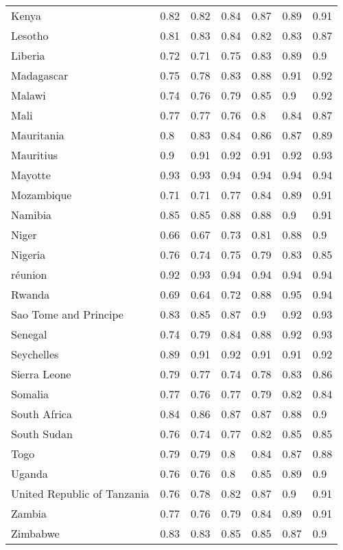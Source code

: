 \begin{longtable}[t]{lllllll}
Kenya & 0.82 & 0.82 & 0.84 & 0.87 & 0.89 & 0.91\\
Lesotho & 0.81 & 0.83 & 0.84 & 0.82 & 0.83 & 0.87\\
Liberia & 0.72 & 0.71 & 0.75 & 0.83 & 0.89 & 0.9\\
Madagascar & 0.75 & 0.78 & 0.83 & 0.88 & 0.91 & 0.92\\
Malawi & 0.74 & 0.76 & 0.79 & 0.85 & 0.9 & 0.92\\
Mali & 0.77 & 0.77 & 0.76 & 0.8 & 0.84 & 0.87\\
Mauritania & 0.8 & 0.83 & 0.84 & 0.86 & 0.87 & 0.89\\
Mauritius & 0.9 & 0.91 & 0.92 & 0.91 & 0.92 & 0.93\\
Mayotte & 0.93 & 0.93 & 0.94 & 0.94 & 0.94 & 0.94\\
Mozambique & 0.71 & 0.71 & 0.77 & 0.84 & 0.89 & 0.91\\
Namibia & 0.85 & 0.85 & 0.88 & 0.88 & 0.9 & 0.91\\
Niger & 0.66 & 0.67 & 0.73 & 0.81 & 0.88 & 0.9\\
Nigeria & 0.76 & 0.74 & 0.75 & 0.79 & 0.83 & 0.85\\
réunion & 0.92 & 0.93 & 0.94 & 0.94 & 0.94 & 0.94\\
Rwanda & 0.69 & 0.64 & 0.72 & 0.88 & 0.95 & 0.94\\
Sao Tome and Principe & 0.83 & 0.85 & 0.87 & 0.9 & 0.92 & 0.93\\
Senegal & 0.74 & 0.79 & 0.84 & 0.88 & 0.92 & 0.93\\
Seychelles & 0.89 & 0.91 & 0.92 & 0.91 & 0.91 & 0.92\\
Sierra Leone & 0.79 & 0.77 & 0.74 & 0.78 & 0.83 & 0.86\\
Somalia & 0.77 & 0.76 & 0.77 & 0.79 & 0.82 & 0.84\\
South Africa & 0.84 & 0.86 & 0.87 & 0.87 & 0.88 & 0.9\\
South Sudan & 0.76 & 0.74 & 0.77 & 0.82 & 0.85 & 0.85\\
Togo & 0.79 & 0.79 & 0.8 & 0.84 & 0.87 & 0.88\\
Uganda & 0.76 & 0.76 & 0.8 & 0.85 & 0.89 & 0.9\\
United Republic of Tanzania & 0.76 & 0.78 & 0.82 & 0.87 & 0.9 & 0.91\\
Zambia & 0.77 & 0.76 & 0.79 & 0.84 & 0.89 & 0.91\\
Zimbabwe & 0.83 & 0.83 & 0.85 & 0.85 & 0.87 & 0.9\\*
\end{longtable}
\endgroup{}
